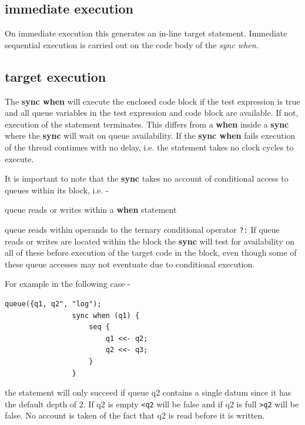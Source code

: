         \subsection{immediate execution}
        
            On immediate execution this generates an in-line target statement.
            Immediate sequential execution is carried out on the code body of
            the {\em sync when}.
        
        \subsection{target execution}

            The {\bf sync when} will execute the enclosed code block if the
            test expression is true and all queue variables in the test
            expression and code block are available. If not, execution of the
            statement terminates. This differs from a {\bf when} inside a 
            {\bf sync} where the {\bf sync} will wait on queue availability.
            If the {\bf sync when} fails execution of the thread continues
            with no delay, i.e. the statement takes no clock cycles to execute.
            
            It is important to note that the {\bf sync} takes no account
            of conditional access to queues within its block, i.e. -
            \blist
            \item   queue reads or writes within a {\bf when} statement
            \item   queue reads within operands to the ternary conditional
                    operator \verb'?:'
            \blend
            If queue reads or writes are located within the block the {\bf sync}
            will test for availability on all of these before execution of the
            target code in the block, even though some of these queue accesses
            may not eventuate due to conditional execution.
            
            For example in the following case -
            \begin{lstlisting}[gobble=12, language=threepl]
                queue({q1, q2", "log");
                sync when (q1) {
                    seq {
                        q1 <<- q2;
                        q2 <<- q3;
                    }
                }
            \end{lstlisting}
            the statement will only succeed if queue q2 contains a single datum
            since it has the default depth of 2. If q2 is empty \verb'<q2' will be
            false and if q2 is full \verb'>q2' will be false. No account is taken
            of the fact that q2 is read before it is written.
            

